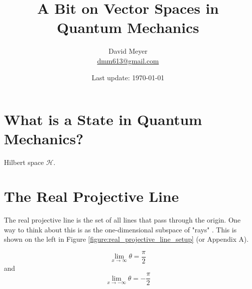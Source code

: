 \documentclass{article}
\title{A Bit on Vector Spaces in Quantum Mechanics}
\author{David Meyer \\ \href{mailto:dmm613@gmail.com}
                            {dmm613@gmail.com}}
\date{Last update: \today}
\theoremstyle{definition}
\begin{document}
\maketitle
%
%
%
\section{What is a State in Quantum Mechanics?}
Hilbert space $\mathcal{H}$.
%
%
%
\section{The Real Projective Line}
\label{section:real_projective_line}
The real projective line is the set of all lines that pass
through the origin. One way to think about this is as the
one-dimensional subspace of "rays" 
\cite{youtube:vector_spaces_and_quantum_mechanics,wolfram:ray}. 
This is shown on the left in Figure
\ref{figure:real_projective_line_setup} (or Appendix A).

\bigskip
\noindent
{}

\begin{equation*}
   \lim\limits_{x \to \infty} \theta = \frac{\pi}{2} 
\end{equation*}
\noindent
and
\begin{equation*}
   \lim\limits_{x \to -\infty} \theta = -\frac{\pi}{2} 
\end{equation*}


\vspace{1.00em}
\end{document}
